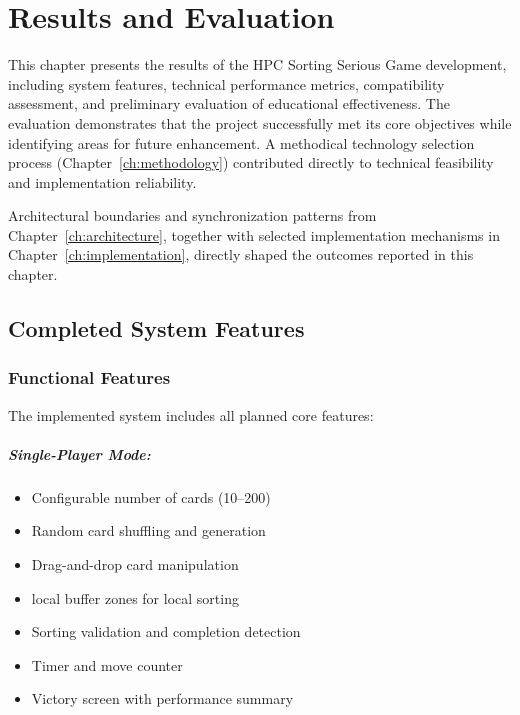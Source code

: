 \chapter{Results and Evaluation}
\label{ch:results}

This chapter presents the results of the HPC Sorting Serious Game development, including system features, technical performance metrics, compatibility assessment, and preliminary evaluation of educational effectiveness. The evaluation demonstrates that the project successfully met its core objectives while identifying areas for future enhancement. A methodical technology selection process (Chapter~\ref{ch:methodology}) contributed directly to technical feasibility and implementation reliability.

Architectural boundaries and synchronization patterns from Chapter~\ref{ch:architecture}, together with selected implementation mechanisms in Chapter~\ref{ch:implementation}, directly shaped the outcomes reported in this chapter.

\section{Completed System Features}
\label{sec:completed-features}

\subsection{Functional Features}
\label{subsec:functional-features}

The implemented system includes all planned core features:

\paragraph*{Single-Player Mode:}
\begin{itemize}
    \item Configurable number of cards (10--200)
    \item Random card shuffling and generation
    \item Drag-and-drop card manipulation
    \item local buffer zones for local sorting
    \item Sorting validation and completion detection
    \item Timer and move counter
    \item Victory screen with performance summary
\end{itemize}

